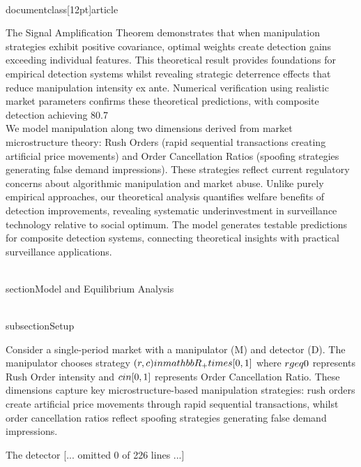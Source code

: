 \\documentclass[12pt]{article}
\begin{document}
The Signal Amplification Theorem demonstrates that when manipulation strategies exhibit positive covariance, optimal weights create detection gains exceeding individual features. This theoretical result provides foundations for empirical detection systems whilst revealing strategic deterrence effects that reduce manipulation intensity ex ante. Numerical verification using realistic market parameters confirms these theoretical predictions, with composite detection achieving 80.7\\%

We model manipulation along two dimensions derived from market microstructure theory: Rush Orders (rapid sequential transactions creating artificial price movements) and Order Cancellation Ratios (spoofing strategies generating false demand impressions). These strategies reflect current regulatory concerns about algorithmic manipulation and market abuse. Unlike purely empirical approaches, our theoretical analysis quantifies welfare benefits of detection improvements, revealing systematic underinvestment in surveillance technology relative to social optimum. The model generates testable predictions for composite detection systems, connecting theoretical insights with practical surveillance applications.

\\section{Model and Equilibrium Analysis}

\\subsection{Setup}

Consider a single-period market with a manipulator (M) and detector (D). The manipulator chooses strategy $(r,c) \\in \\mathbb{R}_+ \\times [0,1]$ where $r \\geq 0$ represents Rush Order intensity and $c \\in [0,1]$ represents Order Cancellation Ratio. These dimensions capture key microstructure-based manipulation strategies: rush orders create artificial price movements through rapid sequential transactions, whilst order cancellation ratios reflect spoofing strategies generating false demand impressions.

The detector
[... omitted 0 of 226 lines ...]
\end{document}
